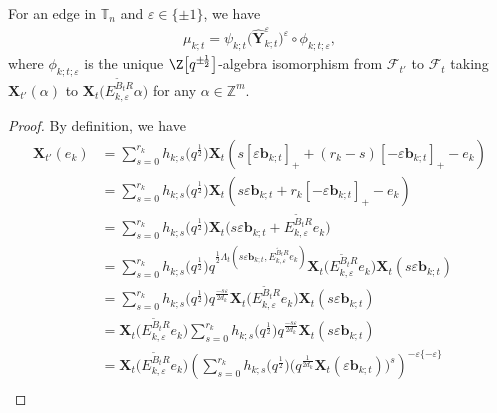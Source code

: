 \begin{Proposition}\label{quantum-decomposition}
 For an edge  in $\mathbb{T}_n$ and $\varepsilon\in \{\pm 1\}$, we have
 \begin{align}\label{eq:FG-dec-gqca}
 \mu_{k;t}=\psi_{k;t}\bigl(\mathbf{\hat{Y}}_{k;t}^{\varepsilon}\bigr)^{\varepsilon}\circ\phi_{k;t;\varepsilon},
 \end{align}
 where $\phi_{k;t;\varepsilon}$ is the unique $\Z\big[q^{\pm\!\frac{1}{2}}\big]$-algebra isomorphism from $\mathcal{F}_{t'}$ to $\mathcal{F}_{\!t}$ taking $\mathbf{X}_{\!t'}(\alpha)$ to $\mathbf{X}_{t}\bigl(E_{\!k,\varepsilon}^{\tilde{B}_{t}R}\alpha\bigr)$ for any $\alpha\in\mathbb{Z}^{m}$.
\end{Proposition}
\begin{proof}
 By definition, we have
 \begin{align*}
 \mathbf{X}_{t'}(e_{k})
 &=\sum\limits^{r_{k}}_{s=0}h_{k;s}\bigl(q^{\frac{1}{2}}\bigr)\mathbf{X}_{t}(s[\varepsilon\mathbf{b}_{k;t}]_{+}+(r_{k}-s)[-\varepsilon\mathbf{b}_{k;t}]_{+}-e_{k})\\
 & =\sum\limits^{r_{k}}_{s=0}h_{k;s}\bigl(q^{\frac{1}{2}}\bigr)\mathbf{X}_{t}(s\varepsilon\mathbf{b}_{k;t}+r_{k}[-\varepsilon\mathbf{b}_{k;t}]_{+}-e_{k})\\
 &=\sum\limits^{r_{k}}_{s=0}h_{k;s}\bigl(q^{\frac{1}{2}}\bigr)\mathbf{X}_{t}\bigl(s\varepsilon\mathbf{b}_{k;t}+E_{k,\varepsilon}^{\tilde{B}_{t}R}e_{k}\bigr)\\
 &=\sum\limits^{r_{k}}_{s=0}h_{k;s}\bigl(q^{\frac{1}{2}}\bigr)q^{\frac{1}{2}\Lambda_{t}(s\varepsilon\mathbf{b}_{k;t},E_{k,\varepsilon}^{\tilde{B}_{t}R}e_{k})}\mathbf{X}_{t}\bigl(E^{\tilde{B}_{t}R}_{k,\varepsilon}e_{k}\bigr)\mathbf{X}_{t}(s\varepsilon\mathbf{b}_{k;t})\\
 &=\sum\limits^{r_{k}}_{s=0}h_{k;s}\bigl(q^{\frac{1}{2}}\bigr)q^{\frac{-s\varepsilon}{2d_{k}}}\mathbf{X}_{t}\bigl(E^{\tilde{B}_{t}R}_{k,\varepsilon}e_{k}\bigr)\mathbf{X}_{t}(s\varepsilon\mathbf{b}_{k;t})\\
 &=\mathbf{X}_{t}\bigl(E^{\tilde{B}_{t}R}_{k,\varepsilon}e_{k}\bigr)\sum\limits^{r_{k}}_{s=0}h_{k;s}\bigl(q^{\frac{1}{2}}\bigr)q^{\frac{-s\varepsilon}{2d_{k}}}\mathbf{X}_{t}(s\varepsilon\mathbf{b}_{k;t})\\
 &=\mathbf{X}_{t}\bigl(E^{\tilde{B}_{t}R}_{k,\varepsilon}e_{k}\bigr)\left(\sum\limits^{r_{k}}_{s=0}h_{k;s}\bigl(q^{\frac{1}{2}}\bigr)\bigl(q^{\frac{1}{2d_{k}}}\mathbf{X}_{t}(\varepsilon\mathbf{b}_{k;t})\bigr)^{s}\right)^{-\varepsilon\{-\varepsilon\}}\\

\end{align*}
\end{proof}
